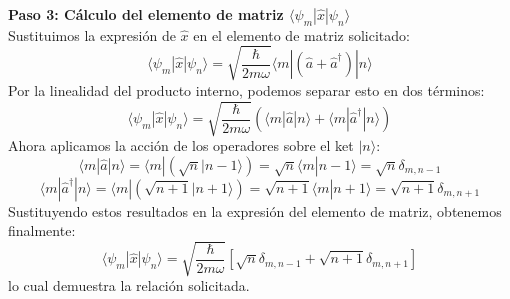 \documentclass[a4paper]{article}
\begin{document}
\vspace{0.3cm}
\noindent\textbf{Paso 3: Cálculo del elemento de matriz $\langle \psi_m | \hat{x} | \psi_n \rangle$} \\
Sustituimos la expresión de $\hat{x}$ en el elemento de matriz solicitado:
$$
\langle \psi_m | \hat{x} | \psi_n \rangle = \sqrt{\frac{\hbar}{2m\omega}} \langle m | (\hat{a} + \hat{a}^\dagger) | n \rangle
$$
Por la linealidad del producto interno, podemos separar esto en dos términos:
$$
\langle \psi_m | \hat{x} | \psi_n \rangle = \sqrt{\frac{\hbar}{2m\omega}} \left( \langle m | \hat{a} | n \rangle + \langle m | \hat{a}^\dagger | n \rangle \right)
$$
Ahora aplicamos la acción de los operadores sobre el ket $|n\rangle$:
$$
\langle m | \hat{a} | n \rangle = \langle m | \left( \sqrt{n} |n-1\rangle \right) = \sqrt{n} \langle m | n-1 \rangle = \sqrt{n} \delta_{m, n-1}
$$
$$
\langle m | \hat{a}^\dagger | n \rangle = \langle m | \left( \sqrt{n+1} |n+1\rangle \right) = \sqrt{n+1} \langle m | n+1 \rangle = \sqrt{n+1} \delta_{m, n+1}
$$
Sustituyendo estos resultados en la expresión del elemento de matriz, obtenemos finalmente:
$$
\langle \psi_m | \hat{x} | \psi_n \rangle = \sqrt{\frac{\hbar}{2m\omega}} \left[ \sqrt{n} \delta_{m, n-1} + \sqrt{n+1} \delta_{m, n+1} \right]
$$
lo cual demuestra la relación solicitada.
\end{document}
